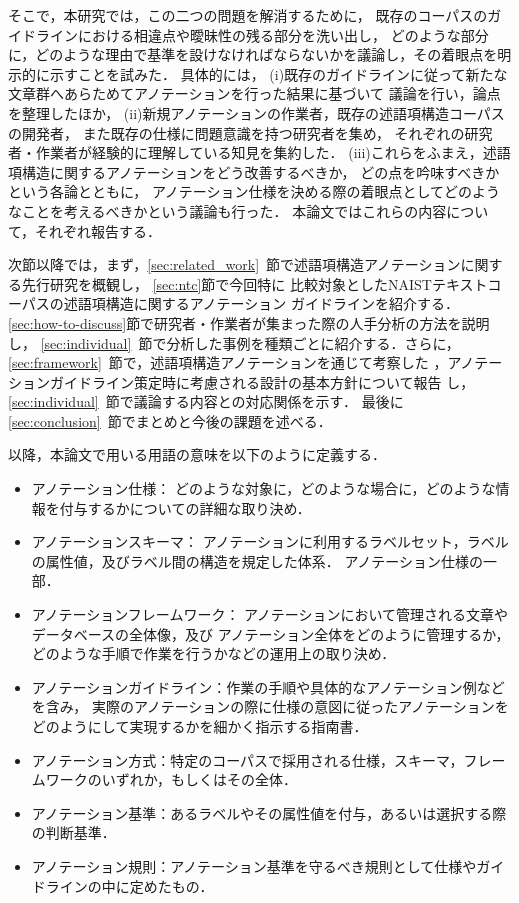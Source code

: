 \documentclass[japanese]{jnlp_1.4}
\begin{document}
そこで，本研究では，この二つの問題を解消するために，
既存のコーパスのガイドラインにおける相違点や曖昧性の残る部分を洗い出し，
どのような部分に，どのような理由で基準を設けなければならないかを議論し，その着眼点を明示的に示すことを試みた．
具体的には，
(i)既存のガイドラインに従って新たな文章群へあらためてアノテーションを行った結果に基づいて
議論を行い，論点を整理したほか，
(ii)新規アノテーションの作業者，既存の述語項構造コーパスの開発者，
また既存の仕様に問題意識を持つ研究者を集め，
それぞれの研究者・作業者が経験的に理解している知見を集約した．
(iii)これらをふまえ，述語項構造に関するアノテーションをどう改善するべきか，
どの点を吟味すべきかという各論とともに，
アノテーション仕様を決める際の着眼点としてどのようなことを考えるべきかという議論も行った．
本論文ではこれらの内容について，それぞれ報告する．

次節以降では，まず，\ref{sec:related_work}~節で述語項構造アノテーションに関する先行研究を概観し，
\ref{sec:ntc}節で今回特に
比較対象としたNAISTテキストコーパスの述語項構造に関するアノテーション
ガイドラインを紹介する．
\ref{sec:how-to-discuss}節で研究者・作業者が集まった際の人手分析の方法を説明し，
\ref{sec:individual}~節で分析した事例を種類ごとに紹介する．さらに，
\ref{sec:framework}~節で，述語項構造アノテーションを通じて考察した
，アノテーションガイドライン策定時に考慮される設計の基本方針について報告
し，\ref{sec:individual}~節で議論する内容との対応関係を示す．
最後に\ref{sec:conclusion}~節でまとめと今後の課題を述べる．


以降，本論文で用いる用語の意味を以下のように定義する．
\begin{itemize}
\item アノテーション仕様：
どのような対象に，どのような場合に，どのような情報を付与するかについての詳細な取り決め．
\item アノテーションスキーマ：
アノテーションに利用するラベルセット，ラベルの属性値，及びラベル間の構造を規定した体系．
アノテーション仕様の一部．
\item アノテーションフレームワーク：
アノテーションにおいて管理される文章やデータベースの全体像，及び
アノテーション全体をどのように管理するか，どのような手順で作業を行うかなどの運用上の取り決め．
\item アノテーションガイドライン：作業の手順や具体的なアノテーション例などを含み，
実際のアノテーションの際に仕様の意図に従ったアノテーションをどのようにして実現するかを細かく指示する指南書．
\item アノテーション方式：特定のコーパスで採用される仕様，スキーマ，フレームワークのいずれか，もしくはその全体．
\item アノテーション基準：あるラベルやその属性値を付与，あるいは選択する際の判断基準．
\item アノテーション規則：アノテーション基準を守るべき規則として仕様やガイドラインの中に定めたもの．
\end{itemize}
\end{document}
